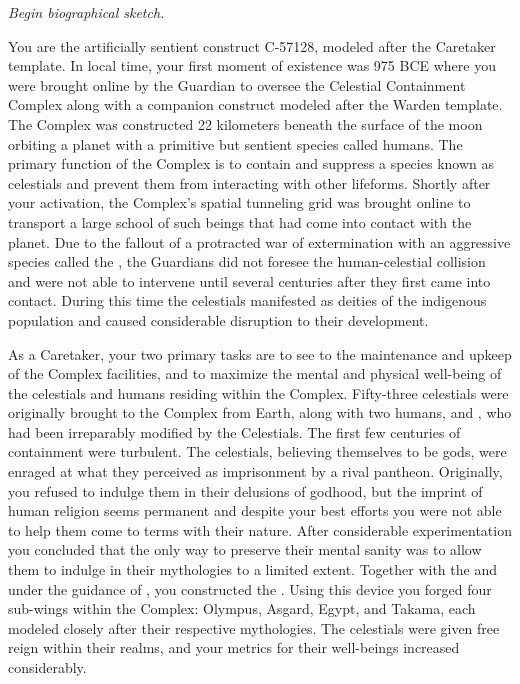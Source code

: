 \documentclass[char]{guardians}
\begin{document}
\name{\cCaretaker{}}

\emph{Begin biographical sketch.}

You are the artificially sentient construct C-57128, modeled after the Caretaker template. In local time, your first moment of existence was 975 BCE where you were brought online by the Guardian \cJascha{\intro} to oversee the Celestial Containment Complex along with a companion construct modeled after the Warden template. The Complex was constructed 22 kilometers beneath the surface of the moon orbiting a planet with a primitive but sentient species called humans. The primary function of the Complex is to contain and suppress a species known as celestials and prevent them from interacting with other lifeforms. Shortly after your activation, the Complex's spatial tunneling grid was brought online to transport a large school of such beings that had come into contact with the planet. Due to the fallout of a protracted war of extermination with an aggressive species called the \evilRace{}, the Guardians did not foresee the human-celestial collision and were not able to intervene until several centuries after they first came into contact. During this time the celestials manifested as deities of the indigenous population and caused considerable disruption to their development.

As a Caretaker, your two primary tasks are to see to the maintenance and upkeep of the Complex facilities, and to maximize the mental and physical well-being of the celestials and humans residing within the Complex. Fifty-three celestials were originally brought to the Complex from Earth, along with two humans, \cPandora{} and \cEgyptianHuman{}, who had been irreparably modified by the Celestials. The first few centuries of containment were turbulent. The celestials, believing themselves to be gods, were enraged at what they perceived as imprisonment by a rival pantheon. Originally, you refused to indulge them in their delusions of godhood, but the imprint of human religion seems permanent and despite your best efforts you were not able to help them come to terms with their nature. After considerable experimentation you concluded that the only way to preserve their mental sanity was to allow them to indulge in their mythologies to a limited extent. Together with the \cWarden{} and under the guidance of \cJascha{}, you constructed the \stone{}. Using this device you forged four sub-wings within the Complex: Olympus, Asgard, Egypt, and Takama, each modeled closely after their respective mythologies. The celestials were given free reign within their realms, and your metrics for their well-beings increased considerably.
\end{document}
